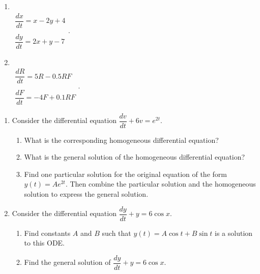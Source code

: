 \documentclass[10pt]{article}
\begin{document}
\begin{multicols}{2}
\begin{enumerate}
\setcounter{enumi}{\theenumCount}
\item ~ \\ $\begin{array}{c} \dfrac{dx}{dt} = x - 2y + 4 \\ ~ \\ \dfrac{dy}{dt} = 2x + y - 7 \end{array}$.


\item ~ \\ $\begin{array}{c} \dfrac{dR}{dt} = 5R - 0.5 RF \\ ~ \\ \dfrac{dF}{dt} = -4F + 0.1RF \end{array}$.

\setcounter{enumCount}{\theenumi}
\end{enumerate} 
\end{multicols}
\vfill


\newpage
\begin{enumerate}
\setcounter{enumi}{\theenumCount}
\item Consider the differential equation $\dfrac{dv}{dt} + 6v = e^{2t}$.  
\begin{enumerate}
\item What is the corresponding homogeneous differential equation? 
\vfill

\item What is the general solution of the homogeneous differential equation?
\vfill

\item Find one particular solution for the original equation of the form $y(t) = Ae^{2t}$. Then combine the particular solution and the homogeneous solution to express the general solution.  
\vfill
\end{enumerate}





\item Consider the differential equation $\dfrac{dy}{dt} + y = 6 \cos x.$
\begin{enumerate}
\item Find constants $A$ and $B$ such that $y(t) = A \cos t + B \sin t$ is a solution to this ODE.
\vfill


\item Find the general solution of $\dfrac{dy}{dt} + y = 6 \cos x$. 
\vfill
\end{enumerate}

\setcounter{enumCount}{\theenumi}
\end{enumerate}
\end{document}

